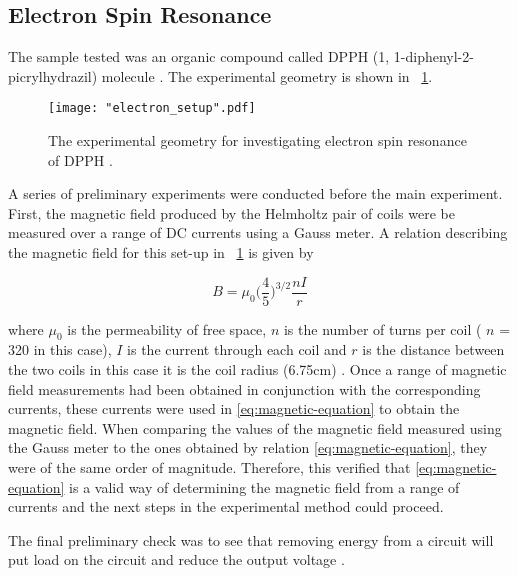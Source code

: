 \documentclass{article}
\newcommand{\figref}[2][\figurename~]{#1\ref{#2}}
\begin{document}
\subsection{Electron Spin Resonance}
\label{ssec:electron-method}

The sample tested was an organic compound called DPPH (1, 1-diphenyl-2-picrylhydrazil) molecule \cite{Paper02}. The experimental geometry is shown in \figref{fig:electron_setup}. 

\begin{figure}[h]
\centering
\texttt{[image: "electron\_setup".pdf]}
\caption{The experimental geometry for investigating electron spin resonance of DPPH \cite{Paper02}.}
\label{fig:electron_setup}
\end{figure}

\vspace{2mm}
\noindent
A series of preliminary experiments were conducted before the main experiment. First, the magnetic field produced by the Helmholtz pair of coils were be measured over a range of DC currents using a Gauss meter. A relation describing the magnetic field for this set-up in \figref{fig:electron_setup} is given by

\begin{equation}
\label{eq:magnetic-equation}
B = \mu_0\Bigg(\frac{4}{5}\Bigg)^{3/2}\frac{nI}{r}
\end{equation}

\vspace{2mm}
\noindent
where $\mu_0$ is the permeability of free space, $n$ is the number of turns per coil ( $n$ = 320 in this case), $I$ is the current through each coil and $r$ is the distance between the two coils in this case it is the coil radius (6.75cm) \cite{Paper02}. Once a range of magnetic field measurements had been obtained in conjunction with the corresponding currents, these currents were used in \eqref{eq:magnetic-equation} to obtain the magnetic field. When comparing the values of the magnetic field measured using the Gauss meter to the ones obtained by relation \eqref{eq:magnetic-equation}, they were of the same order of magnitude. Therefore, this verified that \eqref{eq:magnetic-equation} is a valid way of determining the magnetic field from a range of currents and the next steps in the experimental method could proceed.

\vspace{2mm}
\noindent
The final preliminary check was to see that removing energy from a circuit will put load on the circuit and reduce the output voltage \cite{Paper02}.
\end{document}
